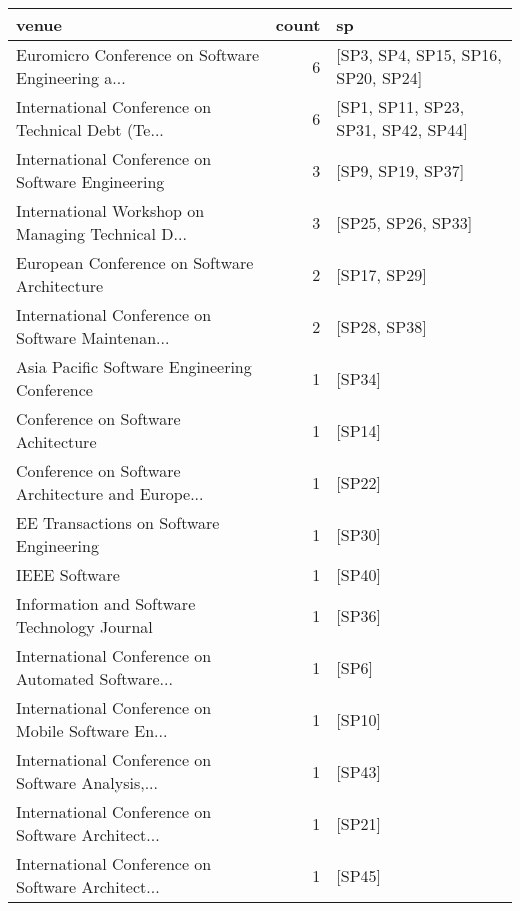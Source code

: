 \begin{tabular}{lrl}
\toprule
                                             venue &  count &                                   sp \\
\midrule
 Euromicro Conference on Software Engineering a... &      6 &   [SP3, SP4, SP15, SP16, SP20, SP24] \\
 International Conference on Technical Debt (Te... &      6 &  [SP1, SP11, SP23, SP31, SP42, SP44] \\
  International Conference on Software Engineering &      3 &                    [SP9, SP19, SP37] \\
 International Workshop on Managing Technical D... &      3 &                   [SP25, SP26, SP33] \\
      European Conference on Software Architecture &      2 &                         [SP17, SP29] \\
 International Conference on Software Maintenan... &      2 &                         [SP28, SP38] \\
      Asia Pacific Software Engineering Conference &      1 &                               [SP34] \\
                Conference on Software Achitecture &      1 &                               [SP14] \\
 Conference on Software Architecture and Europe... &      1 &                               [SP22] \\
           EE Transactions on Software Engineering &      1 &                               [SP30] \\
                                     IEEE Software &      1 &                               [SP40] \\
       Information and Software Technology Journal &      1 &                               [SP36] \\
 International Conference on Automated Software... &      1 &                                [SP6] \\
 International Conference on Mobile Software En... &      1 &                               [SP10] \\
 International Conference on Software Analysis,... &      1 &                               [SP43] \\
 International Conference on Software Architect... &      1 &                               [SP21] \\
 International Conference on Software Architect... &      1 &                               [SP45] \\

\end{tabular}
